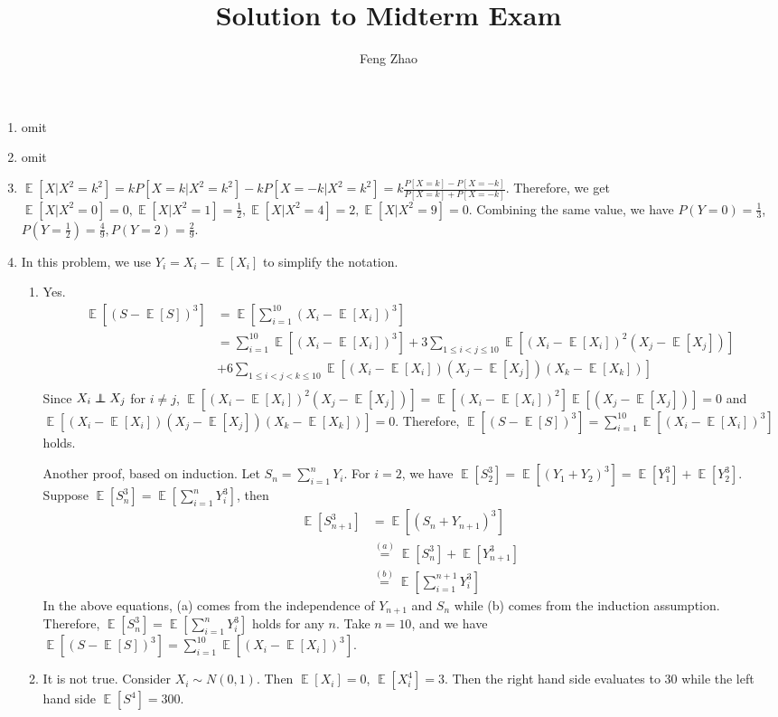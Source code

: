 \documentclass{article}
\author{Feng Zhao}
\title{Solution to Midterm Exam}
\DeclareMathOperator{\E}{\mathbb{E}}
\newcommand\independent{\protect\mathpalette{\protect\independenT}{\perp}}
\def\independenT#1#2{\mathrel{\rlap{$#1#2$}\mkern2mu{#1#2}}}
\begin{document}
\maketitle
\begin{enumerate}
    \item omit
    \item omit
    \item $\E[X|X^2=k^2]
=kP[X=k|X^2=k^2]-kP[X=-k|X^2=k^2]
=k\frac{P[X=k]-P[X=-k]}{P[X=k]+P[X=-k]}$.
Therefore, we get $\E[X|X^2=0]=0,\E[X|X^2=1]=\frac{1}{2},
\E[X|X^2=4]=2,\E[X|X^2=9]=0$.
Combining the same value, we have $P(Y=0)=\frac{1}{3}$,
$P(Y=\frac{1}{2})=\frac{4}{9},P(Y=2)=\frac{2}{9}$.
\item In this problem, we use $Y_i = X_i - \E[X_i]$ to simplify the notation.
\begin{enumerate}
    \item Yes. 
    \begin{align*}
        \E[(S-\E[S])^3] &=
        \E[\sum_{i=1}^{10} (X_i - \E[X_i])^3]
        \\
        &=\sum_{i=1}^{10} \E[(X_i-\E[X_i])^3] +3
        \sum_{1\leq i < j \leq 10}\E[(X_i-\E[X_i])^2(X_j-\E[X_j])]
        \\
        &+ 6
        \sum_{1\leq i < j <k \leq 10}\E[(X_i-\E[X_i])(X_j-\E[X_j])(X_k-\E[X_k])]\\
    \end{align*}
    Since $X_i \independent X_j$ for $i\neq j$,
    $\E[(X_i-\E[X_i])^2(X_j-\E[X_j])]=\E[(X_i-\E[X_i])^2]\E[(X_j-\E[X_j])]=0$
    and $\E[(X_i-\E[X_i])(X_j-\E[X_j])(X_k-\E[X_k])] = 0$.
    Therefore, 
    $\E[(S-\E[S])^3] = \sum_{i=1}^{10} \E[(X_i-\E[X_i])^3]$ holds.
    
    Another proof, based on induction. Let $S_n = \sum_{i=1}^n Y_i$.
    For $i=2$, we have
    $\E[S_2^3] = \E[(Y_1 + Y_2)^3]=\E[Y_1^3]+\E[Y_2^3]
    $.
    Suppose $\E[S_n^3]=\E[\sum_{i=1}^n Y_i^3]
    $,
    then
    \begin{align*}
    \E[S_{n+1}^3]
    & =\E[(S_n + Y_{n+1})^3] \\
    & \stackrel{(a)}{=} \E[S_n^3] + \E[Y_{n+1}^3] \\
    & \stackrel{(b)}{=}\E[\sum_{i=1}^{n+1} Y_i^3]
    \end{align*}
    In the above equations, (a) comes from the independence of $Y_{n+1}$ and $S_n$ while (b) comes from the induction assumption.
    Therefore, $\E[S_n^3]=\E[\sum_{i=1}^n Y_i^3]$ holds for any $n$.
    Take $n=10$, and we have $\E[(S-\E[S])^3] = \sum_{i=1}^{10} \E[(X_i-\E[X_i])^3]$.
    \item It is not true. Consider $X_i \sim N(0,1)$. Then $\E[X_i]=0$,
    $\E[X^4_i]=3$. Then the right hand side evaluates to 30 while
    the left hand side $\E[S^4]=300$.
    

\end{enumerate}
\end{enumerate}
\end{document}
